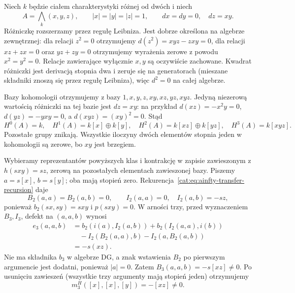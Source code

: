 \begin{przyklad}\label{cat:ex:ainfty-nonformal-exterior}
Niech $k$ będzie ciałem charakterystyki różnej od dwóch i niech
\[
 A=\bigwedge_k(x,y,z),\qquad |x|=|y|=|z|=1,\qquad dx=dy=0,\quad dz=xy.
\]
Różniczkę rozszerzamy przez regułę Leibniza. Jest dobrze określona na algebrze zewnętrznej: dla relacji $z^2=0$ otrzymujemy $d(z^2)=xyz-zxy=0$, dla relacji $xz+zx=0$ oraz $yz+zy=0$ otrzymujemy wyrażenia zerowe z powodu $x^2=y^2=0$. Relacje zawierające wyłącznie $x,y$ są oczywiście zachowane. Kwadrat różniczki jest derivacją stopnia dwa i zeruje się na generatorach (mieszane składniki znoszą się przez regułę Leibniza), więc $d^2=0$ na całej algebrze.

Bazy kohomologii otrzymujemy z bazy $1,x,y,z,xy,xz,yz,xyz$. Jedyną niezerową wartością różniczki na tej bazie jest $dz=xy$: na przykład $d(xz)=-x^2y=0$, $d(yz)=-yxy=0$, a $d(xyz)=(xy)^2=0$. Stąd
\[
 H^0(A)=k,\quad H^1(A)=k[x]\oplus k[y],\quad
 H^2(A)=k[xz]\oplus k[yz],\quad H^3(A)=k[xyz].
\]
Pozostałe grupy znikają. Wszystkie iloczyny dwóch elementów stopnia jeden w kohomologii są zerowe, bo $xy$ jest brzegiem.

Wybieramy reprezentantów powyższych klas i kontrakcję w zapisie zawieszonym z $h(sxy)=sz$, zerową na pozostałych elementach zawieszonej bazy. Piszemy $a=s[x]$, $b=s[y]$; oba mają stopień zero. Rekurencja~\eqref{cat:eq:ainfty-transfer-recursion} daje
\[
 B_2(a,a)=B_2(a,b)=0,\qquad
 I_2(a,a)=0,\quad I_2(a,b)=-sz,
\]
ponieważ $b_2(sx,sy)=sxy$ i $p(sxy)=0$. W arności trzy, przed wyznaczeniem $B_3,I_3$, defekt na $(a,a,b)$ wynosi
\[
\begin{aligned}
 e_3(a,a,b)&=b_2(i(a),I_2(a,b))
 +b_2(I_2(a,a),i(b))\\
 &\quad-I_2(B_2(a,a),b)-I_2(a,B_2(a,b))\\
 &=-s(xz).
\end{aligned}
\]
Nie ma składnika $b_3$ w algebrze DG, a znak wstawienia $B_2$ po pierwszym argumencie jest dodatni, ponieważ $|a|=0$. Zatem $B_3(a,a,b)=-s[xz]\neq0$. Po usunięciu zawieszeń (wszystkie trzy argumenty mają stopień jeden) otrzymujemy
\[
 m_3^H([x],[x],[y])=-[xz]\neq0.
\]


\end{przyklad}
